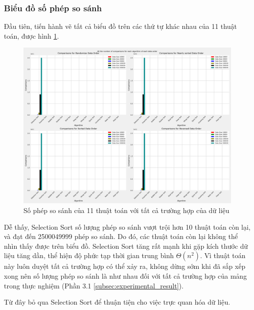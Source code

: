 \subsubsection{Biểu đồ số phép so sánh}

Đầu tiên, tiến hành vẽ tất cả biểu đồ trên các thứ tự khác nhau của 11 thuật toán, được hình \ref{fig:all_the_number_of_comparisons_for_each_algorithm_of_each_data_order}.

\begin{figure}[H]
    \centering
    \includegraphics[width=\textwidth]{experimental_result/images/all_the_number_of_comparisons_for_each_algorithm_of_each_data_order.png}
    \caption{Số phép so sánh của 11 thuật toán với tất cả trường hợp của dữ liệu}
    \label{fig:all_the_number_of_comparisons_for_each_algorithm_of_each_data_order}
\end{figure}

Dễ thấy, Selection Sort số lượng phép so sánh vượt trội hơn 10 thuật toán còn lại, và đạt đến 2500049999 phép so sánh. Do đó, các thuật toán còn lại không thể nhìn thấy được trên biểu đồ. Selection Sort tăng rất mạnh khi gặp kích thước dữ liệu tăng dần, thể hiện độ phức tạp thời gian trung bình $\Theta(n^2)$. Vì thuật toán này luôn duyệt tất cả trường hợp có thể xảy ra, không dừng sớm khi đã sắp xếp xong nên số lượng phép so sánh là như nhau đối với tất cả trường hợp của mảng trong thực nghiệm (Phần 3.1 \ref{subsec:experimental_result}).  

Từ đây bỏ qua Selection Sort để thuận tiện cho việc trực quan hóa dữ liệu.


